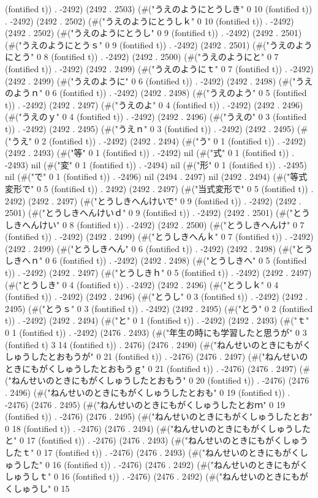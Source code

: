 (fontified t)) . -2492) (2492 . 2503) (#("うえのようにとうしき" 0 10 (fontified t)) . -2492) (2492 . 2502) (#("うえのようにとうしｋ" 0 10 (fontified t)) . -2492) (2492 . 2502) (#("うえのようにとうし" 0 9 (fontified t)) . -2492) (2492 . 2501) (#("うえのようにとうｓ" 0 9 (fontified t)) . -2492) (2492 . 2501) (#("うえのようにとう" 0 8 (fontified t)) . -2492) (2492 . 2500) (#("うえのようにと" 0 7 (fontified t)) . -2492) (2492 . 2499) (#("うえのようにｔ" 0 7 (fontified t)) . -2492) (2492 . 2499) (#("うえのように" 0 6 (fontified t)) . -2492) (2492 . 2498) (#("うえのようｎ" 0 6 (fontified t)) . -2492) (2492 . 2498) (#("うえのよう" 0 5 (fontified t)) . -2492) (2492 . 2497) (#("うえのよ" 0 4 (fontified t)) . -2492) (2492 . 2496) (#("うえのｙ" 0 4 (fontified t)) . -2492) (2492 . 2496) (#("うえの" 0 3 (fontified t)) . -2492) (2492 . 2495) (#("うえｎ" 0 3 (fontified t)) . -2492) (2492 . 2495) (#("うえ" 0 2 (fontified t)) . -2492) (2492 . 2494) (#("う" 0 1 (fontified t)) . -2492) (2492 . 2493) (#("等" 0 1 (fontified t)) . -2492) nil (#("式" 0 1 (fontified t)) . -2493) nil (#("変" 0 1 (fontified t)) . -2494) nil (#("形" 0 1 (fontified t)) . -2495) nil (#("で" 0 1 (fontified t)) . -2496) nil (2494 . 2497) nil (2492 . 2494) (#("等式変形で" 0 5 (fontified t)) . 2492) (2492 . 2497) (#("当式変形で" 0 5 (fontified t)) . 2492) (2492 . 2497) (#("とうしきへんけいで" 0 9 (fontified t)) . -2492) (2492 . 2501) (#("とうしきへんけいｄ" 0 9 (fontified t)) . -2492) (2492 . 2501) (#("とうしきへんけい" 0 8 (fontified t)) . -2492) (2492 . 2500) (#("とうしきへんけ" 0 7 (fontified t)) . -2492) (2492 . 2499) (#("とうしきへんｋ" 0 7 (fontified t)) . -2492) (2492 . 2499) (#("とうしきへん" 0 6 (fontified t)) . -2492) (2492 . 2498) (#("とうしきへｎ" 0 6 (fontified t)) . -2492) (2492 . 2498) (#("とうしきへ" 0 5 (fontified t)) . -2492) (2492 . 2497) (#("とうしきｈ" 0 5 (fontified t)) . -2492) (2492 . 2497) (#("とうしき" 0 4 (fontified t)) . -2492) (2492 . 2496) (#("とうしｋ" 0 4 (fontified t)) . -2492) (2492 . 2496) (#("とうし" 0 3 (fontified t)) . -2492) (2492 . 2495) (#("とうｓ" 0 3 (fontified t)) . -2492) (2492 . 2495) (#("とう" 0 2 (fontified t)) . -2492) (2492 . 2494) (#("と" 0 1 (fontified t)) . -2492) (2492 . 2493) (#("ｔ" 0 1 (fontified t)) . -2492) (2476 . 2493) (#("年生の時にも学習したと思うが" 0 3 (fontified t) 3 14 (fontified t)) . 2476) (2476 . 2490) (#("ねんせいのときにもがくしゅうしたとおもうが" 0 21 (fontified t)) . -2476) (2476 . 2497) (#("ねんせいのときにもがくしゅうしたとおもうｇ" 0 21 (fontified t)) . -2476) (2476 . 2497) (#("ねんせいのときにもがくしゅうしたとおもう" 0 20 (fontified t)) . -2476) (2476 . 2496) (#("ねんせいのときにもがくしゅうしたとおも" 0 19 (fontified t)) . -2476) (2476 . 2495) (#("ねんせいのときにもがくしゅうしたとおｍ" 0 19 (fontified t)) . -2476) (2476 . 2495) (#("ねんせいのときにもがくしゅうしたとお" 0 18 (fontified t)) . -2476) (2476 . 2494) (#("ねんせいのときにもがくしゅうしたと" 0 17 (fontified t)) . -2476) (2476 . 2493) (#("ねんせいのときにもがくしゅうしたｔ" 0 17 (fontified t)) . -2476) (2476 . 2493) (#("ねんせいのときにもがくしゅうした" 0 16 (fontified t)) . -2476) (2476 . 2492) (#("ねんせいのときにもがくしゅうしｔ" 0 16 (fontified t)) . -2476) (2476 . 2492) (#("ねんせいのときにもがくしゅうし" 0 15 